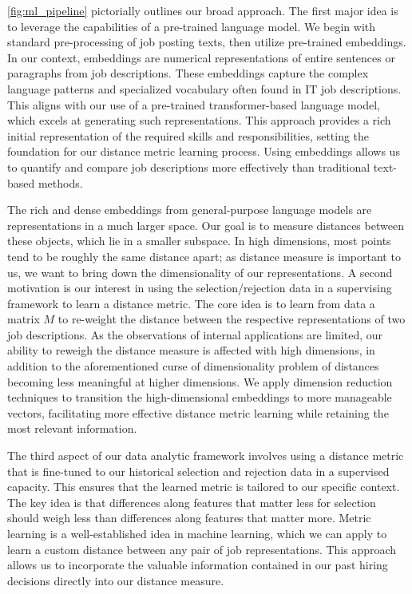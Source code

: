 \documentclass[12pt]{article}
\begin{document}
\autoref{fig:ml_pipeline} pictorially outlines our broad approach. The first major idea is to leverage the capabilities of a pre-trained language model. We begin with standard pre-processing of job posting texts, then utilize pre-trained embeddings. In our context, embeddings are numerical representations of entire sentences or paragraphs from job descriptions. These embeddings capture the complex language patterns and specialized vocabulary often found in IT job descriptions. This aligns with our use of a pre-trained transformer-based language model, which excels at generating such representations. This approach provides a rich initial representation of the required skills and responsibilities, setting the foundation for our distance metric learning process. Using embeddings allows us to quantify and compare job descriptions more effectively than traditional text-based methods.

The rich and dense embeddings from general-purpose language models are representations in a much larger space. Our goal is to measure distances between these objects, which lie in a smaller subspace. In high dimensions, most points tend to be roughly the same distance apart; as distance measure is important to us, we want to bring down the dimensionality of our representations. A second motivation is our interest in using the selection/rejection data in a supervising framework to learn a distance metric. The core idea is to learn from data a matrix $M$ to re-weight the distance between the respective representations of two job descriptions. As the observations of internal applications are limited, our ability to reweigh the distance measure is affected with high dimensions, in addition to the aforementioned curse of dimensionality problem of distances becoming less meaningful at higher dimensions. We apply dimension reduction techniques to transition the high-dimensional embeddings to more manageable vectors, facilitating more effective distance metric learning while retaining the most relevant information.


The third aspect of our data analytic framework involves using a distance metric that is fine-tuned to our historical selection and rejection data in a supervised capacity. This ensures that the learned metric is tailored to our specific context. The key idea is that differences along features that matter less for selection should weigh less than differences along features that matter more. Metric learning is a well-established idea in machine learning, which we can apply to learn a custom distance between any pair of job representations. This approach allows us to incorporate the valuable information contained in our past hiring decisions directly into our distance measure.
\end{document}
